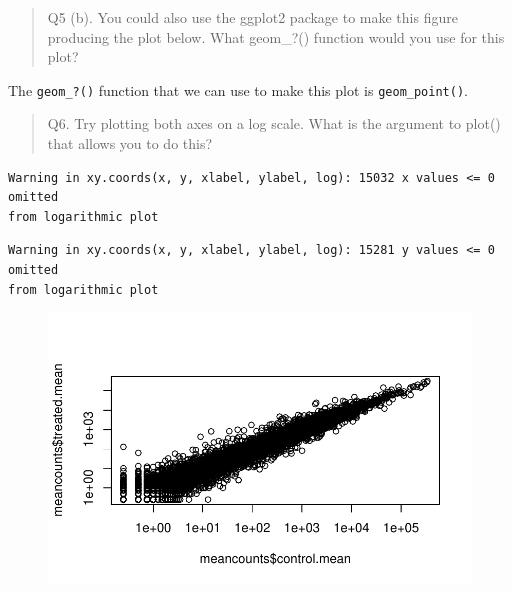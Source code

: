 \documentclass[
  letterpaper,
  DIV=11,
  numbers=noendperiod]{scrartcl}
\newenvironment{Shaded}{\begin{snugshade}}{\end{snugshade}}
\newcommand{\AttributeTok}[1]{\textcolor[rgb]{0.40,0.45,0.13}{#1}}
\newcommand{\FunctionTok}[1]{\textcolor[rgb]{0.28,0.35,0.67}{#1}}
\newcommand{\NormalTok}[1]{\textcolor[rgb]{0.00,0.23,0.31}{#1}}
\newcommand{\SpecialCharTok}[1]{\textcolor[rgb]{0.37,0.37,0.37}{#1}}
\newcommand{\StringTok}[1]{\textcolor[rgb]{0.13,0.47,0.30}{#1}}
\begin{document}
\begin{quote}
Q5 (b). You could also use the ggplot2 package to make this figure
producing the plot below. What geom\_?() function would you use for this
plot?
\end{quote}

The \texttt{geom\_?()} function that we can use to make this plot is
\texttt{geom\_point()}.

\begin{quote}
Q6. Try plotting both axes on a log scale. What is the argument to
plot() that allows you to do this?
\end{quote}

\begin{Shaded}
\end{Shaded}

\begin{verbatim}
Warning in xy.coords(x, y, xlabel, ylabel, log): 15032 x values <= 0 omitted
from logarithmic plot
\end{verbatim}

\begin{verbatim}
Warning in xy.coords(x, y, xlabel, ylabel, log): 15281 y values <= 0 omitted
from logarithmic plot
\end{verbatim}

\begin{figure}[H]

{\centering \includegraphics{class12_files/figure-pdf/unnamed-chunk-17-1.pdf}

}

\end{figure}
\end{document}
